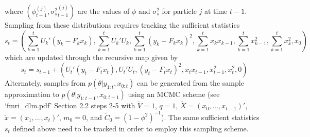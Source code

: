 \documentclass{article}
\begin{document}
where $\left(\phi_{t-1}^{(j)},{\sigma^2_s}_{t-1}^{(j)}\right)$ are the values of $\phi$ and $\sigma^2_s$ for particle $j$ at time $t-1$. Sampling from these distributions requires tracking the sufficient statistics \[s_t = \left(\sum_{k=1}^t U_k'(y_k - F_kx_k),\sum_{k=1}^t U_k'U_k,\sum_{k=1}^t (y_k - F_kx_k)^2,\sum_{k=1}^t x_kx_{k-1},\sum_{k=1}^t x_{k-1}^2,\sum_{k=1}^t x_k^2,x_0\right)\] which are updated through the recursive map given by \[s_t = s_{t-1} + \left(U_t'(y_t - F_tx_t),U_t'U_t,(y_t - F_tx_t)^2,x_tx_{t-1},x_{t-1}^2,x_t^2,0\right)\]
Alternately, samples from $p(\theta|y_{1:t},x_{0:t})$ can be generated from the sample approximation to $p(\theta|y_{1:t-1},x_{0:t-1})$ using an MCMC scheme (see `fmri\_dlm.pdf' Section 2.2 steps 2-5 with $\tilde{V} = 1$, $q = 1$, $\tilde{X} = (x_0,\ldots,x_{t-1})'$, $\tilde{x} = (x_1,\ldots,x_t)'$, $m_0 = 0$, and $\tilde{C}_0 = (1-\phi^2)^{-1}$). The same sufficient statistics $s_t$ defined above need to be tracked in order to employ this sampling scheme.

\clearpage



\end{document}
